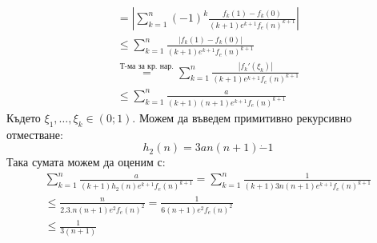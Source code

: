 \begin{solution}
\begin{equation}
\begin{split}
            = \left| \sum_{k=1}^n (-1)^{k} \frac{f_k(1) - f_k(0)}{(k+1)e^{k+1}f_e(n)^{k+1}}\right| \\
            \leq \sum_{k=1}^n \frac{\left|f_k(1) - f_k(0)\right|}{(k+1)e^{k+1}f_e(n)^{k+1}} \\
            \overset{\text{Т-ма за кр. нар.}}{=} \sum_{k=1}^n \frac{\left|f_k'(\xi_k)\right|}{(k+1)e^{k+1}f_e(n)^{k+1}}\\
            \leq \sum_{k=1}^n \frac{a}{(k+1)(n+1)e^{k+1}f_e(n)^{k+1}}
        \end{split}
    \end{equation}
    Където $\xi_1, \dots, \xi_k \in (0;1)$. Можем да въведем примитивно рекурсивно отместване:
    \begin{equation}
        h_2(n) = 3an(n+1)\dot{-} 1
    \end{equation}
    Така сумата можем да оценим с:
    \begin{equation}
        \begin{split}
            \sum_{k=1}^n \frac{a}{(k+1)h_2(n)e^{k+1}f_e(n)^{k+1}} = \sum_{k=1}^n \frac{1}{(k+1)3n(n+1)e^{k+1}f_e(n)^{k+1}}\\
            \leq \frac{n}{2.3.n(n+1)e^2f_e(n)^2} = \frac{1}{6(n+1)e^2f_e(n)^2} \\
            \leq \frac{1}{3(n+1)}
        \end{split}
    \end{equation}
    

\end{solution}
